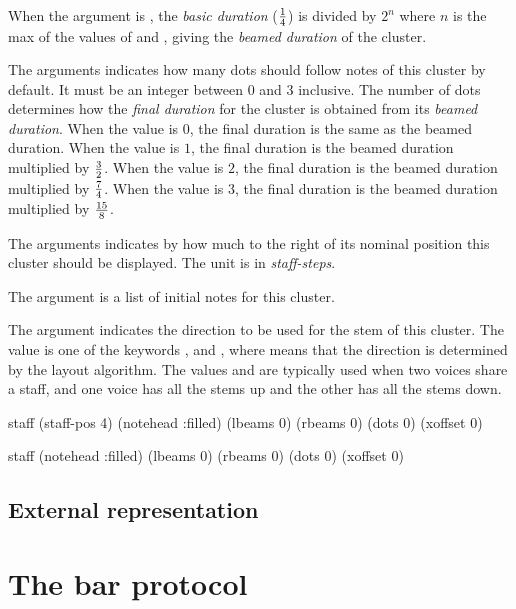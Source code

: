When the  argument is , the
\emph{basic duration} ($1 \over 4$) is divided by $2^n$ where $n$ is the max
of the values of  and , giving the
\emph{beamed duration} of the cluster. 

The  arguments indicates how many dots should follow
notes of this cluster by default.  It must be an integer between $0$
and $3$ inclusive.  The number of dots determines how the \emph{final
duration} for the cluster is obtained from its \emph{beamed duration}.
When the value is $0$, the final duration is the same as the beamed
duration.  When the value is $1$, the final duration is the beamed
duration multiplied by $3 \over 2$.  When the value is $2$, the final
duration is the beamed duration multiplied by $7 \over 4$.  When the
value is $3$, the final duration is the beamed duration multiplied by
$15 \over 8$.

The  arguments indicates by how much to the right of
its nominal position this cluster should be displayed.  The unit is in
\emph{staff-steps}. 

The  argument is a list of initial notes for this
cluster.

The  argument indicates the direction to be
used for the stem of this cluster.  The value is one of the keywords
,  and , where
 means that the direction is determined by the layout
algorithm.  The values  and  are typically
used when two voices share a staff, and one voice has all the stems up
and the other has all the stems down. 

 {staff \key (staff-pos 4) (notehead :filled) (lbeams 0) (rbeams 0)
                    (dots 0) (xoffset 0)}

 {staff \key (notehead :filled) (lbeams 0) (rbeams 0)
                    (dots 0) (xoffset 0)}

\subsection{External representation}


\section{The bar protocol}

